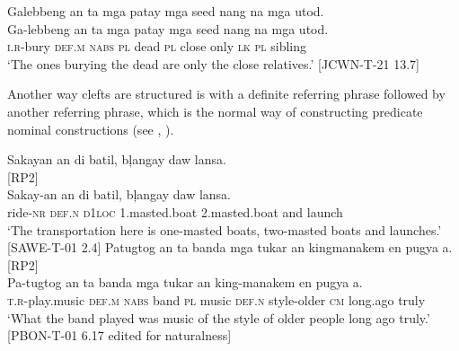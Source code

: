 \ea 
Galebbeng  an  ta  mga  patay  mga  seed  nang  na  mga  utod. \\\smallskip
\gll Ga-lebbeng  an  ta  mga  patay  mga  seed  nang  na  mga  utod. \\
\textsc{i.r}-bury    \textsc{def.m}  \textsc{nabs}  \textsc{pl}  dead  \textsc{pl}  close  only  \textsc{lk}  \textsc{pl}  sibling \\
\glt ‘The ones burying the dead are only the close relatives.’ [JCWN-T-21 13.7]
\z

Another way clefts are structured is with a definite referring phrase followed by another referring phrase, which is the normal way of constructing predicate nominal constructions  (see , ).

\ea 
Sakayan  an  di  batil,    bļangay  daw  lansa. \\\hspace{.5cm}   [\hspace{2.6cm}RP2\hspace{2.6cm}] \\
\gll Sakay-an  an  di  batil,    bļangay  daw  lansa. \\
ride-\textsc{nr}  \textsc{def.n}  \textsc{d}1\textsc{loc}  1.masted.boat  2.masted.boat  and  launch \\
\glt ‘The transportation here is one-masted boats, two-masted boats and launches.’ [SAWE-T-01 2.4]
\z
\ea 
Patugtog  an  ta  banda  mga  tukar  an  kingmanakem  en  pugya  a. \\\hspace{.4cm} [\hspace{3.5cm}RP2\hspace{3.5cm}] \\\smallskip
\gll Pa-tugtog  an  ta  banda  mga  tukar  an  king-manakem  en  pugya  a. \\
\textsc{t.r}-play.music  \textsc{def.m}  \textsc{nabs}  band  \textsc{pl}  music  \textsc{def.n}  style-older  \textsc{cm}  long.ago  truly \\
\glt ‘What the band played was music of the style of older people long ago truly.’ [PBON-T-01 6.17 edited for naturalness]
\z

